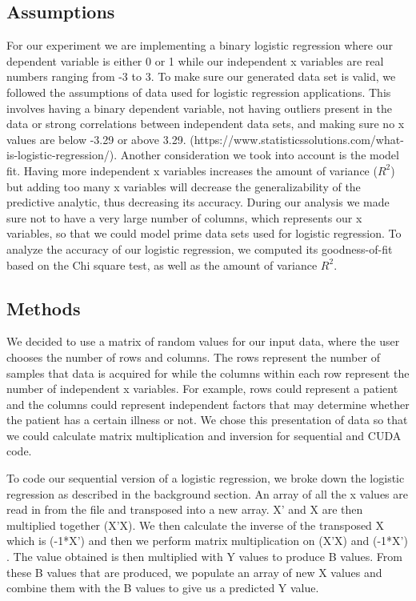 \documentclass[letterpaper, 10 pt, conference]{ieeeconf}  %
\begin{document}
\subsection{Assumptions}
For our experiment we are implementing a binary logistic regression where our dependent variable is either 0 or 1 while our independent x variables are real numbers ranging from -3 to 3. To make sure our generated data set is valid, we followed the assumptions of data used for logistic regression applications. This involves having a binary dependent variable, not having outliers present in the data or strong correlations between independent data sets, and making sure no x values are below -3.29 or above 3.29. (https://www.statisticssolutions.com/what-is-logistic-regression/). Another consideration we took into account is the model fit. Having more independent x variables increases the amount of variance ($R^2$) but adding too many x variables will decrease the generalizability of the predictive analytic, thus decreasing its accuracy. During our analysis we made sure not to have a very large number of columns, which represents our x variables, so that we could model prime data sets used for logistic regression. To analyze the accuracy of our logistic regression, we computed its goodness-of-fit based on the Chi square test, as well as the amount of variance $R^2$. 

\subsection{Methods}
We decided to use a matrix of random values for our input data, where the user chooses the number of rows and columns. The rows represent the number of samples that data is acquired for while the columns within each row represent the number of independent x variables. For example, rows could represent a patient and the columns could represent independent factors that may determine whether the patient has a certain illness or not. We chose this presentation of data so that we could calculate matrix multiplication and inversion for sequential and CUDA code. 

To code our sequential version of a logistic regression, we broke down the logistic regression as described in the background section. An array of all the x values are read in from the file and transposed into a new array. X’ and X are then multiplied together (X’X). We then calculate the inverse of the transposed X which is (-1*X') and then we perform matrix multiplication on (X’X) and (-1*X’) . The value obtained is then multiplied with Y values to produce B values. From these B values that are produced, we populate an array of new X values and combine them with the B values to give us a predicted Y value. 
\end{document}
